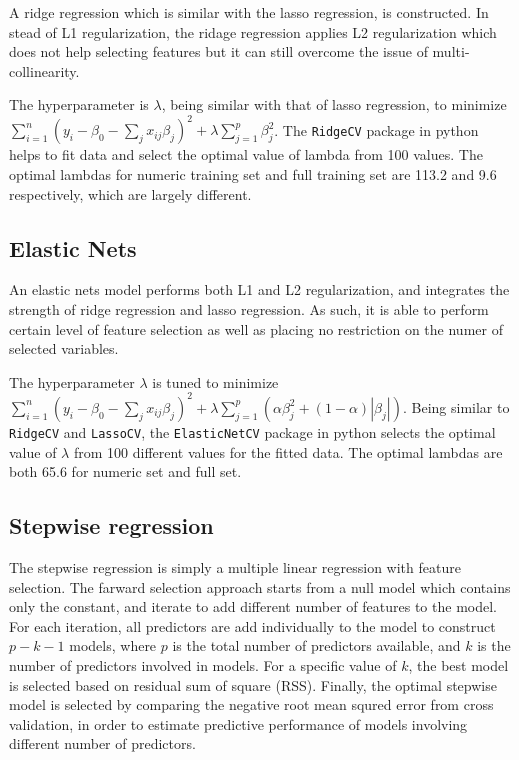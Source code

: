 \documentclass[letterpaper,12pt,twoside,]{pinp}
\begin{document}
A ridge regression which is similar with the lasso regression, is
constructed. In stead of L1 regularization, the ridage regression
applies L2 regularization which does not help selecting features but it
can still overcome the issue of multi-collinearity.

The hyperparameter is \(\lambda\), being similar with that of lasso
regression, to minimize
\(\sum^n_{i=1}(y_i-\beta_0-\sum_jx_{ij}\beta_j)^2+\lambda\sum^p_{j=1}\beta_j^2\).
The \texttt{RidgeCV} package in python helps to fit data and select the
optimal value of lambda from 100 values. The optimal lambdas for numeric
training set and full training set are 113.2 and 9.6 respectively, which
are largely different.

\hypertarget{elastic-nets}{%
\subsection{Elastic Nets}\label{elastic-nets}}

An elastic nets model performs both L1 and L2 regularization, and
integrates the strength of ridge regression and lasso regression. As
such, it is able to perform certain level of feature selection as well
as placing no restriction on the numer of selected variables.

The hyperparameter \(\lambda\) is tuned to minimize
\(\sum^n_{i=1}(y_i-\beta_0-\sum_jx_{ij}\beta_j)^2+\lambda\sum^p_{j=1}(\alpha \beta_j^2+(1-\alpha)|\beta_j|)\).
Being similar to \texttt{RidgeCV} and \texttt{LassoCV}, the
\texttt{ElasticNetCV} package in python selects the optimal value of
\(\lambda\) from 100 different values for the fitted data. The optimal
lambdas are both 65.6 for numeric set and full set.

\hypertarget{stepwise-regression}{%
\subsection{Stepwise regression}\label{stepwise-regression}}

The stepwise regression is simply a multiple linear regression with
feature selection. The farward selection approach starts from a null
model which contains only the constant, and iterate to add different
number of features to the model. For each iteration, all predictors are
add individually to the model to construct \(p-k-1\) models, where \(p\)
is the total number of predictors available, and \(k\) is the number of
predictors involved in models. For a specific value of \(k\), the best
model is selected based on residual sum of square (RSS). Finally, the
optimal stepwise model is selected by comparing the negative root mean
squred error from cross validation, in order to estimate predictive
performance of models involving different number of predictors.
\end{document}
